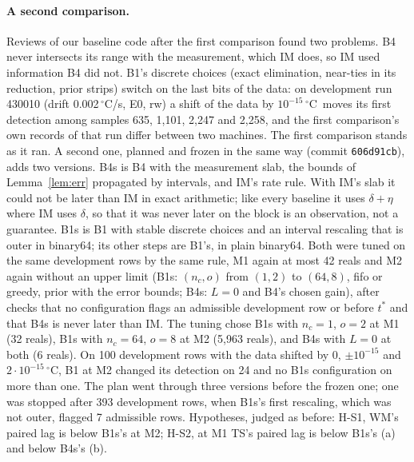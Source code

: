 \documentclass[11pt,a4paper]{article}
\newcommand{\degC}{\ensuremath{{}^\circ}C}
\newcommand{\tstar}{t^{\ast}}
\begin{document}
\paragraph{A second comparison.} Reviews of our baseline code after the first comparison found two problems. B4 never
intersects its range with the measurement, which IM does, so IM used information B4 did not. B1's discrete choices
(exact elimination, near-ties in its reduction, prior strips) switch on the last bits of the data: on development run
430010 (drift 0.002\,\degC/s, E0, rw) a shift of the data by $10^{-15}$\,\degC\ moves its first detection among
samples 635, 1,101, 2,247 and 2,258, and the first comparison's own records of that run differ between two machines.
The first comparison stands as it ran. A second one, planned and frozen in the same way (commit \texttt{606d91cb}),
adds two versions. B4s is B4 with the measurement slab, the bounds of Lemma~\ref{lem:err} propagated by intervals, and
IM's rate rule. With IM's slab it could not be later than IM in exact arithmetic; like every baseline it uses
$\delta+\eta$ where IM uses $\delta$, so that it was never later on the block is an observation, not a guarantee. B1s is B1 with stable discrete choices and an interval
rescaling that is outer in binary64; its other steps are B1's, in plain binary64. Both were tuned on the same
development rows by the same rule, M1 again at most 42 reals and M2 again without an upper limit (B1s: $(n_c, o)$ from
$(1, 2)$ to $(64, 8)$, fifo or greedy, prior with the error bounds; B4s: $L = 0$ and B4's chosen gain), after checks
that no configuration flags an admissible development row or before $\tstar$ and that B4s is never later than IM.
The tuning chose B1s with $n_c = 1$, $o = 2$ at M1 (32 reals), B1s with $n_c = 64$, $o = 8$ at M2 (5,963 reals), and
B4s with $L = 0$ at both (6 reals). On 100 development rows with the data shifted by 0, $\pm10^{-15}$ and
$2\cdot10^{-15}$\,\degC, B1 at M2 changed its detection on 24 and no B1s configuration on more than one. The plan went
through three versions before the frozen one; one was stopped after 393 development rows, when B1s's first
rescaling, which was not outer, flagged 7 admissible rows. Hypotheses, judged as before: H-S1, WM's paired lag is
below B1s's at M2; H-S2, at M1 TS's paired lag is below B1s's (a) and below B4s's (b).
\end{document}
